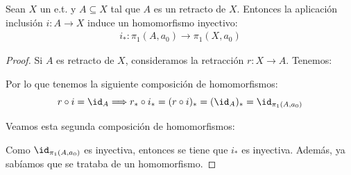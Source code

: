 \begin{lema}\label{lema:inclusion_retractoInyectivo}
    Sean $X$ un e.t. y $A\subseteq X$ tal que $A$ es un retracto de $X$. Entonces la aplicación inclusión $i:A\to X$ induce un homomorfismo inyectivo:
    \begin{gather*}
        i_* : \pi_1(A, a_0) \to \pi_1(X,a_0)
    \end{gather*}

    \begin{proof}
        Si $A$ es retracto de $X$, consideramos la retracción $r :X \to A$. Tenemos:
        \begin{center}
        \end{center}

        Por lo que tenemos la siguiente composición de homomorfismos:
        \begin{equation*}
            r\circ i = \id_A \Longrightarrow r_* \circ i_* = (r\circ i)_* = (\id_A)_* = \id_{\pi_1(A,a_0)}
        \end{equation*}

        Veamos esta segunda composición de homomorfismos:
        \begin{center}
        \end{center}
            
        Como $\id_{\pi_1(A,a_0)}$ es inyectiva, entonces se tiene que $i_*$ es inyectiva. Además, ya sabíamos que se trataba de un homomorfismo.
    \end{proof}
\end{lema}

